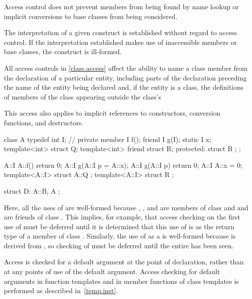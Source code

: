 \pnum
\begin{note}
Access control does not prevent members from being found by name lookup or
implicit conversions to base classes from being considered.
\end{note}
The interpretation of a given construct is
established without regard to access control.
If the interpretation
established makes use of inaccessible members or base classes,
the construct is ill-formed.

\pnum
All access controls in \ref{class.access} affect the ability to name a class member
from the declaration of a particular
entity, including parts of the declaration preceding the name of the entity
being declared and, if the entity is a class, the definitions of members of
the class appearing outside the class's 
\begin{note}
This access also applies to implicit references to constructors,
conversion functions, and destructors.
\end{note}

\pnum
\begin{example}
\begin{codeblock}
class A {
  typedef int I;    // private member
  I f();
  friend I g(I);
  static I x;
  template<int> struct Q;
  template<int> friend struct R;
protected:
    struct B { };
};

A::I A::f() { return 0; }
A::I g(A::I p = A::x);
A::I g(A::I p) { return 0; }
A::I A::x = 0;
template<A::I> struct A::Q { };
template<A::I> struct R { };

struct D: A::B, A { };
\end{codeblock}

Here, all the uses of
are well-formed because
,
, and 
are members of class
and
and  are friends of class
.
This implies, for example, that access checking on the first use of
must be deferred until it is determined that this use of
is as the return type of a member of class
.
Similarly, the use of  as a
 is well-formed because 
is derived from , so checking of 
must be deferred until the entire  has been seen.
\end{example}

\pnum
{}%
%
Access is checked for a default argument
at the point of declaration,
rather than at any points of use of the default argument.
Access checking for default arguments in function templates and in
member functions of class templates is performed as described in~\ref{temp.inst}.

